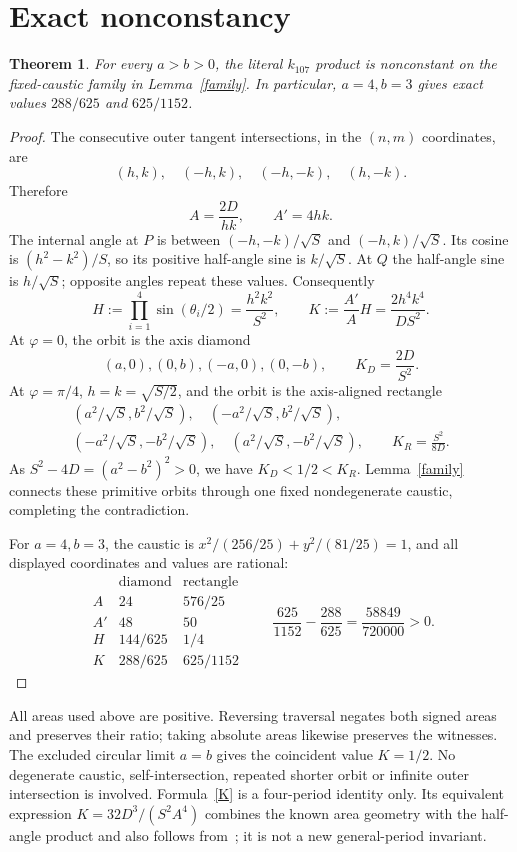 \documentclass[11pt]{article}
\newtheorem{theorem}{Theorem}
\begin{document}
\section{Exact nonconstancy}
\begin{theorem}\label{counterexample}
For every \(a>b>0\), the literal \(k_{107}\) product is nonconstant on the fixed-caustic family in Lemma~\ref{family}. In particular, \(a=4,b=3\) gives exact values \(288/625\) and \(625/1152\).
\end{theorem}
\begin{proof}
The consecutive outer tangent intersections, in the \((n,m)\) coordinates, are
\[
(h,k),\quad(-h,k),\quad(-h,-k),\quad(h,-k).
\]
Therefore
\[
 A=\frac{2D}{hk},\qquad A'=4hk.
\]
The internal angle at \(P\) is between \((-h,-k)/\sqrt S\) and \((-h,k)/\sqrt S\). Its cosine is \((h^2-k^2)/S\), so its positive half-angle sine is \(k/\sqrt S\).
At \(Q\) the half-angle sine is \(h/\sqrt S\); opposite angles repeat these values. Consequently
\begin{equation}\label{K}
 H:=\prod_{i=1}^4\sin(\theta_i/2)=\frac{h^2k^2}{S^2},\qquad
 K:=\frac{A'}A H=\frac{2h^4k^4}{DS^2}.
\end{equation}
At \(\varphi=0\), the orbit is the axis diamond
\[
 (a,0),(0,b),(-a,0),(0,-b),\qquad K_D=\frac{2D}{S^2}.
\]
At \(\varphi=\pi/4\), \(h=k=\sqrt{S/2}\), and the orbit is the axis-aligned rectangle
\[
 \begin{gathered}
 (a^2/\sqrt S,b^2/\sqrt S),\quad(-a^2/\sqrt S,b^2/\sqrt S),\\
 (-a^2/\sqrt S,-b^2/\sqrt S),\quad(a^2/\sqrt S,-b^2/\sqrt S),
 \qquad K_R=\frac{S^2}{8D}.
 \end{gathered}
\]
As \(S^2-4D=(a^2-b^2)^2>0\), we have \(K_D<1/2<K_R\). Lemma~\ref{family} connects these primitive orbits through one fixed nondegenerate caustic, completing the contradiction.

For \(a=4,b=3\), the caustic is \(x^2/(256/25)+y^2/(81/25)=1\), and all displayed coordinates and values are rational:
\[
\begin{array}{c|cc}
 &\text{diamond}&\text{rectangle}\\ \hline
 A&24&576/25\\
 A'&48&50\\
 H&144/625&1/4\\
 K&288/625&625/1152
\end{array}
\qquad
 \frac{625}{1152}-\frac{288}{625}=\frac{58849}{720000}>0.
\]
\end{proof}
All areas used above are positive. Reversing traversal negates both signed areas and preserves their ratio; taking absolute areas likewise preserves the witnesses. The excluded circular limit \(a=b\) gives the coincident value \(K=1/2\). No degenerate caustic, self-intersection, repeated shorter orbit or infinite outer intersection is involved. Formula~\eqref{K} is a four-period identity only. Its equivalent expression \(K=32D^3/(S^2A^4)\) combines the known area geometry with the half-angle product and also follows from~\cite{ferudun}; it is not a new general-period invariant.
\end{document}
